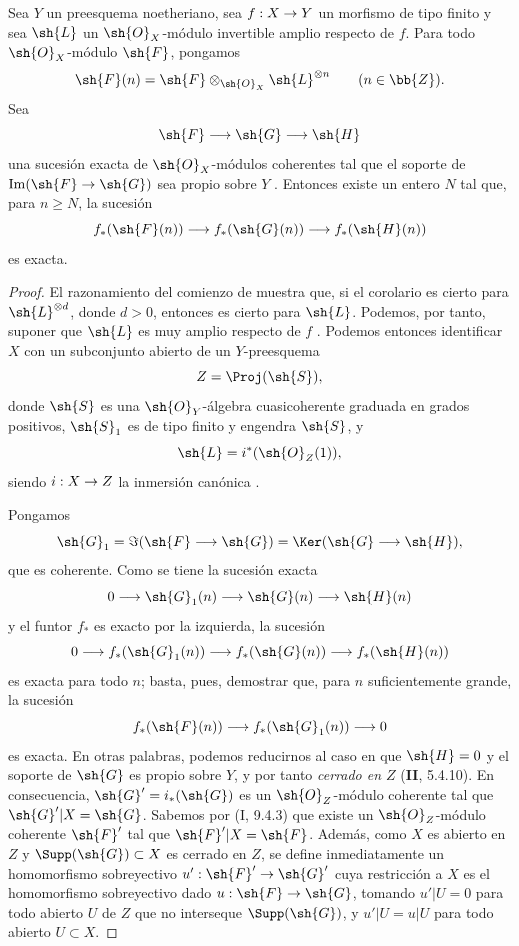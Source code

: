 \documentclass[oneside]{amsart}
\makeatletter
\renewcommand{\geq}{\geqslant}
\newcommand{\ega@arrow}[2]{\mathchoice{#1}{#2}{#2}{#2}}
\renewcommand{\to}{\ega@arrow{\longrightarrow}{\rightarrow}}
\let\EGAOriginalLabel\label
\renewcommand{\label}[1]{\phantomsection\EGAOriginalLabel{#1}}
\makeatother
\begin{document}
\begin{corollary}[2.2.4]
\label{III.2.2.4}
Sea $Y$ un preesquema noetheriano, sea $f:X\to Y$ un morfismo de tipo finito y sea $\sh{L}$ un $\sh{O}_X$-módulo invertible amplio respecto de $f$.
Para todo $\sh{O}_X$-módulo $\sh{F}$, pongamos
\[
  \sh{F}(n)=\sh{F}\otimes_{\sh{O}_X}\sh{L}^{\otimes n}
  \qquad(n\in\bb{Z}).
\]
Sea
\[
  \sh{F}\longrightarrow\sh{G}\longrightarrow\sh{H}
\]
una sucesión exacta de $\sh{O}_X$-módulos coherentes tal que el soporte de $\operatorname{Im}(\sh{F}\to\sh{G})$ sea propio sobre $Y$ \textup{}.
Entonces existe un entero $N$ tal que, para $n\geq N$, la sucesión
\[
  f_*(\sh{F}(n))
  \longrightarrow f_*(\sh{G}(n))
  \longrightarrow f_*(\sh{H}(n))
\]
es exacta.
\end{corollary}

\begin{proof}
El razonamiento del comienzo de  muestra que, si el corolario es cierto para $\sh{L}^{\otimes d}$, donde $d>0$, entonces es cierto para $\sh{L}$.
Podemos, por tanto, suponer que $\sh{L}$ es muy amplio respecto de $f$ .
Podemos entonces identificar $X$ con un subconjunto abierto de un $Y$-preesquema
\[
  Z=\Proj(\sh{S}),
\]
donde $\sh{S}$ es una $\sh{O}_Y$-álgebra cuasicoherente graduada en grados positivos, $\sh{S}_1$ es de tipo finito y engendra $\sh{S}$, y
\[
  \sh{L}=i^*(\sh{O}_Z(1)),
\]
siendo $i:X\to Z$ la inmersión canónica .

Pongamos
\[
  \sh{G}_1=\Im(\sh{F}\to\sh{G})
  =\Ker(\sh{G}\to\sh{H}),
\]
que es coherente. Como se tiene la sucesión exacta
\[
  0\to\sh{G}_1(n)\to\sh{G}(n)\to\sh{H}(n)
\]
y el funtor $f_*$ es exacto por la izquierda, la sucesión
\[
  0\to f_*(\sh{G}_1(n))\to f_*(\sh{G}(n))
  \to f_*(\sh{H}(n))
\]
es exacta para todo $n$; basta, pues, demostrar que, para $n$ suficientemente grande, la sucesión
\[
  f_*(\sh{F}(n))\to f_*(\sh{G}_1(n))\to0
\]
es exacta. En otras palabras, podemos reducirnos al caso en que $\sh{H}=0$ y el soporte de $\sh{G}$ es propio sobre $Y$, y por tanto \emph{cerrado en $Z$} (\textbf{II}, 5.4.10). En consecuencia, $\sh{G}'=i_*(\sh{G})$ es un $\sh{O}_Z$-módulo coherente tal que $\sh{G}'|X=\sh{G}$. Sabemos por (I, 9.4.3) que existe un $\sh{O}_Z$-módulo coherente $\sh{F}'$ tal que $\sh{F}'|X=\sh{F}$. Además, como $X$ es abierto en $Z$ y $\Supp(\sh{G})\subset X$ es cerrado en $Z$, se define inmediatamente un homomorfismo sobreyectivo $u':\sh{F}'\to\sh{G}'$ cuya restricción a $X$ es el homomorfismo sobreyectivo dado $u:\sh{F}\to\sh{G}$, tomando $u'|U=0$ para todo abierto $U$ de $Z$ que no interseque $\Supp(\sh{G})$, y $u'|U=u|U$ para todo abierto $U\subset X$.


\end{proof}
\end{document}
